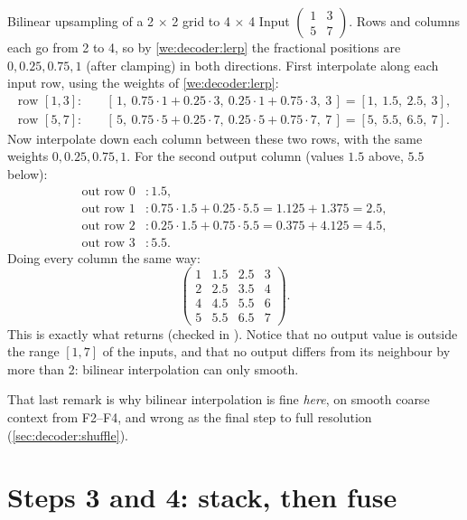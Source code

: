 \begin{worked}[label={we:decoder:bilinear}]{Bilinear upsampling of a 2 \texorpdfstring{$\times$}{x} 2 grid to 4 \texorpdfstring{$\times$}{x} 4}
Input $\begin{pmatrix} 1 & 3\\ 5 & 7\end{pmatrix}$. Rows and columns each go from 2 to 4, so by
\cref{we:decoder:lerp} the fractional positions are $0, 0.25, 0.75, 1$ (after clamping) in both
directions. First interpolate along each input row, using the weights of \cref{we:decoder:lerp}:
\begin{align*}
\text{row } [1, 3]:&\quad [\,1,\ 0.75 \cdot 1 + 0.25 \cdot 3,\ 0.25 \cdot 1 + 0.75 \cdot 3,\ 3\,] = [1,\ 1.5,\ 2.5,\ 3],\\
\text{row } [5, 7]:&\quad [\,5,\ 0.75 \cdot 5 + 0.25 \cdot 7,\ 0.25 \cdot 5 + 0.75 \cdot 7,\ 7\,] = [5,\ 5.5,\ 6.5,\ 7].
\end{align*}
Now interpolate down each column between these two rows, with the same weights $0, 0.25, 0.75, 1$. For
the second output column (values $1.5$ above, $5.5$ below):
\begin{align*}
\text{out row 0}&: 1.5, \\
\text{out row 1}&: 0.75 \cdot 1.5 + 0.25 \cdot 5.5 = 1.125 + 1.375 = 2.5,\\
\text{out row 2}&: 0.25 \cdot 1.5 + 0.75 \cdot 5.5 = 0.375 + 4.125 = 4.5,\\
\text{out row 3}&: 5.5 .
\end{align*}
Doing every column the same way:
\[
\begin{pmatrix} 1 & 1.5 & 2.5 & 3\\ 2 & 2.5 & 3.5 & 4\\ 4 & 4.5 & 5.5 & 6\\ 5 & 5.5 & 6.5 & 7 \end{pmatrix}.
\]
This is exactly what  returns (checked in
). Notice that no output value is outside the range
$[1, 7]$ of the inputs, and that no output differs from its neighbour by more than 2: bilinear
interpolation can only smooth.
\end{worked}

That last remark is why bilinear interpolation is fine \emph{here}, on smooth coarse context from F2--F4,
and wrong as the final step to full resolution (\cref{sec:decoder:shuffle}).

\section{Steps 3 and 4: stack, then fuse}\label{sec:decoder:fuse}


